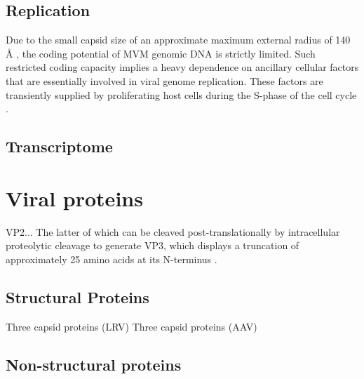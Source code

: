 \subsection{Replication}
Due to the small capsid size of an approximate maximum external radius of 140 \r{A} \cite{pmid15299974}, the coding potential of MVM genomic DNA is strictly limited. Such restricted coding capacity implies a heavy dependence on ancillary cellular factors that are essentially involved in viral genome replication. These factors are transiently supplied by proliferating host cells during the S-phase of the cell cycle \cite{pmid16789120, pmid6602221, pmid3005655, pmid3296697, pmid9418888, pmid4673484, S-phase}.
\subsection{Transcriptome}

\section{Viral proteins}


VP2...
The latter of which can be cleaved post-translationally by intracellular proteolytic cleavage to generate VP3, which displays a truncation of approximately 25 amino acids at its N-terminus \cite{pmid864702, pmid1448928, pmid9770425}. 


\subsection{Structural Proteins}

Three capsid proteins (LRV) \cite{pmid4321164}
Three capsid proteins (AAV) \cite{pmid5132697, pmid5172922}



\subsection{Non-structural proteins}
 


\section{}


\subsection{}



\subsection{}


